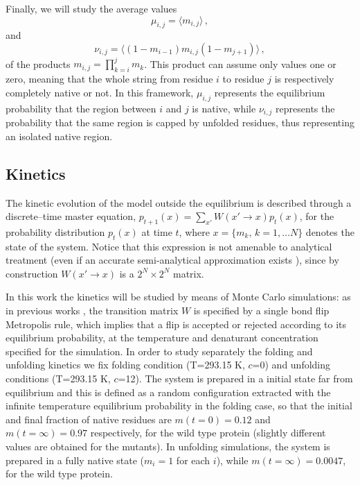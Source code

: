 Finally, we will study the average values  
\begin{equation}
\mu_{i,j} = \langle m_{i,j} \rangle \,,
\label{eq:mu-strings}
\end{equation}
and
\begin{equation}
 \nu_{i,j} = \langle  (1-m_{i-1}) m_{i,j}  (1-m_{j+1}) \rangle\,,
\label{eq:nu-cappedstrings}
\end{equation}
of  the products $m_{i,j}=\prod_{k=i}^j m_k$. This product can assume only
values one or zero, meaning that the whole string from residue $i$ to residue
$j$ is respectively completely native or not. 
In this framework, $\mu_{i,j}$ represents the equilibrium probability that
the region between $i$ and $j$ is native, while $\nu_{i,j}$ represents the
probability that the same region is
capped by unfolded residues, thus representing an isolated native region.


\subsection{Kinetics}

 
The kinetic evolution of the model outside the equilibrium is described through a
discrete--time master equation, $p_{t+1}(x) = \sum_{x'} W(x' \to x) p_t(x)$, 
for the probability distribution
$p_t(x)$ at time $t$, where $x = \{ m_k, \,k = 1, \ldots N \}$ denotes
the state of the system. 
Notice that this expression is not amenable to analytical treatment (even
if an accurate semi-analytical
approximation exists \cite{Zamparo2006,Zamparo2006a}), since by construction
$W(x' \to x)$ is a $2^N \times 2^N$ matrix.


In this work the kinetics will be studied by means of Monte Carlo simulations: as in
previous works \cite{Zamparo2006,Zamparo2006a}, the transition matrix $W$ is
specified by a single bond flip Metropolis rule, which implies that a flip is
accepted or rejected according to its equilibrium probability, at the
temperature and denaturant concentration specified for the simulation.
In order to study separately the folding and unfolding kinetics we fix folding
condition (T=293.15 K, $c$=0) and unfolding
conditions (T=293.15 K, $c$=12). 
The system is prepared in a initial state far from equilibrium and this is
defined as a random configuration extracted with the infinite temperature equilibrium
probability in the folding case, so that the initial
and final fraction of native residues are $ m(t=0)=0.12$ %
and %
$m(t=\infty)=0.97$ respectively, for the wild type protein (slightly different
values are obtained for the mutants).
In unfolding simulations, the system is prepared in a
fully native state ($m_i=1$ for each $i$), while $m(t=\infty)=0.0047$,
for the wild type protein. 


